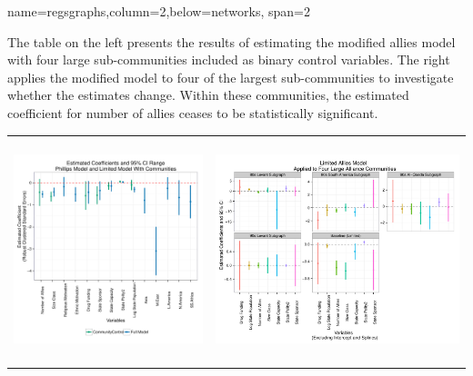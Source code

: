 \documentclass[landscape,paperheight=24in,fontscale=.45,paperwidth=36in,landscape,final]{baposter}
\begin{document}
\begin{poster}

{name=regsgraphs,column=2,below=networks, span=2}
{
The table on the left presents the results of estimating the modified
allies model with four large sub-communities included as binary
control variables. The right applies the modified model to four of the
largest sub-communities to investigate whether the estimates
change. Within these communities, the estimated coefficient for number of allies ceases to be statistically significant.
\vspace{-12mm}
\begin{center}
\begin{tabular}{cc}
 \\ [2.0ex]
\includegraphics[height=65mm,width=70mm]{GeboandPaperTables.pdf}&
\includegraphics[height=65mm,width=90mm]{smallTableCoef.pdf}\\

\end{tabular}
\end{center}
\vspace{-4mm}
}




\end{poster}
\end{document}
